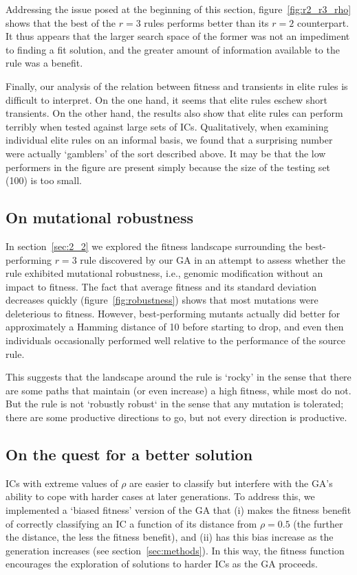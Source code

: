 Addressing the issue posed at the beginning of this section, figure~\ref{fig:r2_r3_rho} shows that the best of the $r = 3$ rules performs better than 
its $r = 2$ counterpart. It thus appears that the larger search space of the former was not an impediment to finding a fit solution, and the greater 
amount of information available to the rule was a benefit.

Finally, our analysis of the relation between fitness and transients in elite rules is difficult to interpret. On the one hand, it seems that elite rules 
eschew short transients. On the other hand, the results also show that elite rules can perform terribly when tested against large sets of ICs.  Qualitatively, 
when examining individual elite rules on an informal basis, we found that a surprising number were actually `gamblers' of the sort described above. 
It may be that the low performers in the figure are present simply because the size of the testing set (100) is too small.

\subsection{On mutational robustness}

In section~\ref{sec:2_2} we explored the fitness landscape surrounding the best-performing $r = 3$ rule discovered by our GA in an attempt to 
assess whether the rule exhibited mutational robustness, i.e., genomic modification without an impact to fitness. The fact that average fitness 
and its standard deviation decreases quickly (figure~\ref{fig:robustness}) shows that most mutations were deleterious to fitness. However, best-performing mutants actually did better for approximately a Hamming distance of 10 before starting to drop, and even then individuals occasionally performed 
well relative to the performance of the source rule.

This suggests that the landscape around the rule is `rocky' in the sense that there are some paths that maintain (or even increase) a high 
fitness, while most do not. But the rule is not `robustly robust` in the sense that any mutation is tolerated; there are some productive directions to go, but 
not every direction is productive.

\subsection{On the quest for a better solution}

ICs with extreme values of $\rho$ are easier to classify but interfere with the GA's ability to cope with harder cases at later generations. To address this, 
we implemented a `biased fitness' version of the GA that (i) makes the fitness benefit of correctly classifying an IC a function of its distance from 
$\rho = 0.5$ (the further the distance, the less the fitness benefit), and (ii) has this bias increase as the generation increases 
(see section~\ref{sec:methods}). In this way, the fitness function encourages the exploration of solutions to harder ICs as the GA proceeds.

